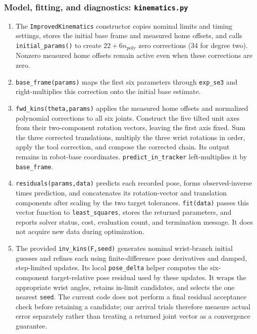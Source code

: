 \documentclass[11pt]{article}
\begin{document}
\subsubsection{Model, fitting, and diagnostics: \texttt{kinematics.py}}
\begin{enumerate}
\setlength{\itemsep}{0pt}
\item The \texttt{ImprovedKinematics} constructor copies nominal limits and timing settings, stores the initial base frame and measured home offsets, and calls \texttt{initial\_params()} to create $22+6n_{\mathrm{poly}}$ zero corrections (34 for degree two). Nonzero measured home offsets remain active even when these corrections are zero.
\item \texttt{base\_frame(params)} maps the first six parameters through \texttt{exp\_se3} and right-multiplies this correction onto the initial base estimate.
\item \texttt{fwd\_kins(theta,params)} applies the measured home offsets and normalized polynomial corrections to all six joints. Construct the five tilted unit axes from their two-component rotation vectors, leaving the first axis fixed. Sum the three corrected translations, multiply the three wrist rotations in order, apply the tool correction, and compose the corrected chain. Its output remains in robot-base coordinates. \texttt{predict\_in\_tracker} left-multiplies it by \texttt{base\_frame}.
\item \texttt{residuals(params,data)} predicts each recorded pose, forms observed-inverse times prediction, and concatenates its rotation-vector and translation components after scaling by the two target tolerances. \texttt{fit(data)} passes this vector function to \texttt{least\_squares}, stores the returned parameters, and reports solver status, cost, evaluation count, and termination message. It does not acquire new data during optimization.
\item The provided \texttt{inv\_kins(F,seed)} generates nominal wrist-branch initial guesses and refines each using finite-difference pose derivatives and damped, step-limited updates. Its local \texttt{pose\_delta} helper computes the six-component target-relative pose residual used by these updates. It wraps the appropriate wrist angles, retains in-limit candidates, and selects the one nearest \texttt{seed}. The current code does not perform a final residual acceptance check before retaining a candidate; our arrival trials therefore measure actual error separately rather than treating a returned joint vector as a convergence guarantee.

\end{enumerate}
\end{document}
